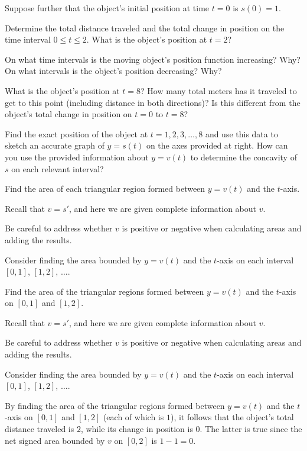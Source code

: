 Suppose further that the object's initial position at time \(t = 0\) is
\(s(0) = 1\).

Determine the total distance traveled and the total change in position
on the time interval \(0 \le t \le 2\). What is the object's position at
\(t = 2\)?

On what time intervals is the moving object's position function
increasing? Why? On what intervals is the object's position decreasing?
Why?

What is the object's position at \(t = 8\)? How many total meters has it
traveled to get to this point (including distance in both directions)?
Is this different from the object's total change in position on
\(t = 0\) to \(t = 8\)?

Find the exact position of the object at \(t = 1, 2, 3, \ldots, 8\) and
use this data to sketch an accurate graph of \(y = s(t)\) on the axes
provided at right. How can you use the provided information about
\(y = v(t)\) to determine the concavity of \(s\) on each relevant
interval?

Find the area of each triangular region formed between \(y = v(t)\) and
the \(t\)-axis.

Recall that \(v = s'\), and here we are given complete information about
\(v\).

Be careful to address whether \(v\) is positive or negative when
calculating areas and adding the results.

Consider finding the area bounded by \(y = v(t)\) and the \(t\)-axis on
each interval \([0,1]\), \([1,2]\), \(\ldots\).

Find the area of the triangular regions formed between \(y = v(t)\) and
the \(t\)-axis on \([0,1]\) and \([1,2]\).

Recall that \(v = s'\), and here we are given complete information about
\(v\).

Be careful to address whether \(v\) is positive or negative when
calculating areas and adding the results.

Consider finding the area bounded by \(y = v(t)\) and the \(t\)-axis on
each interval \([0,1]\), \([1,2]\), \(\ldots\).

By finding the area of the triangular regions formed between
\(y = v(t)\) and the \(t\)-axis on \([0,1]\) and \([1,2]\) (each of
which is \(1\)), it follows that the object's total distance traveled is
\(2\), while its change in position is \(0\). The latter is true since
the net signed area bounded by \(v\) on \([0,2]\) is \(1 - 1 = 0\).

